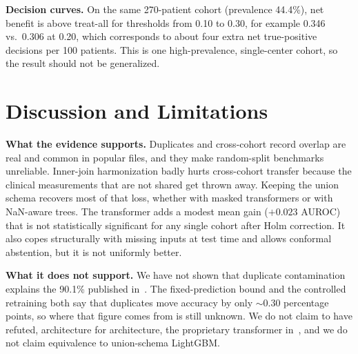 \documentclass[conference]{IEEEtran}
\begin{document}
\textbf{Decision curves.} On the same 270-patient cohort (prevalence 44.4\%), net benefit is above treat-all for thresholds from 0.10 to 0.30, for example 0.346 vs.\ 0.306 at 0.20, which corresponds to about four extra net true-positive decisions per 100 patients. This is one high-prevalence, single-center cohort, so the result should not be generalized.

\section{Discussion and Limitations}\label{sec:discussion}
\textbf{What the evidence supports.} Duplicates and cross-cohort record overlap are real and common in popular files, and they make random-split benchmarks unreliable. Inner-join harmonization badly hurts cross-cohort transfer because the clinical measurements that are not shared get thrown away. Keeping the union schema recovers most of that loss, whether with masked transformers or with NaN-aware trees. The transformer adds a modest mean gain ($+0.023$ AUROC) that is not statistically significant for any single cohort after Holm correction. It also copes structurally with missing inputs at test time and allows conformal abstention, but it is not uniformly better.

\textbf{What it does not support.} We have not shown that duplicate contamination explains the 90.1\% published in~\cite{mahmud2026}. The fixed-prediction bound and the controlled retraining both say that duplicates move accuracy by only $\sim$0.30 percentage points, so where that figure comes from is still unknown. We do not claim to have refuted, architecture for architecture, the proprietary transformer in~\cite{mahmud2026}, and we do not claim equivalence to union-schema LightGBM.
\end{document}
